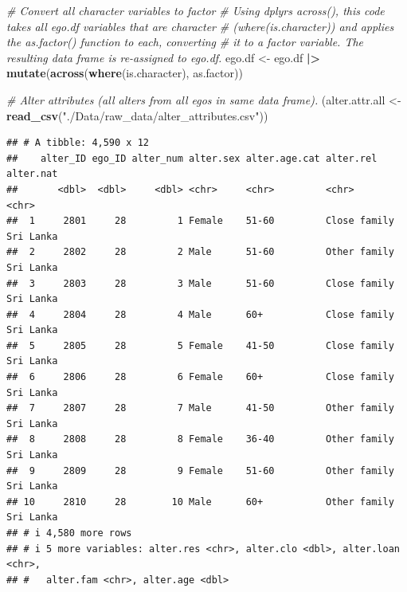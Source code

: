 \documentclass[
]{book}
\newenvironment{Shaded}{\begin{snugshade}}{\end{snugshade}}
\newcommand{\CommentTok}[1]{\textcolor[rgb]{0.56,0.35,0.01}{\textit{#1}}}
\newcommand{\FunctionTok}[1]{\textcolor[rgb]{0.13,0.29,0.53}{\textbf{#1}}}
\newcommand{\NormalTok}[1]{#1}
\newcommand{\OtherTok}[1]{\textcolor[rgb]{0.56,0.35,0.01}{#1}}
\newcommand{\SpecialCharTok}[1]{\textcolor[rgb]{0.81,0.36,0.00}{\textbf{#1}}}
\newcommand{\StringTok}[1]{\textcolor[rgb]{0.31,0.60,0.02}{#1}}
\begin{document}
\begin{Shaded}
\begin{Highlighting}[]
\CommentTok{\# Convert all character variables to factor}
\CommentTok{\# Using dplyr\textquotesingle{}s across(), this code takes all ego.df variables that are character}
\CommentTok{\# (where(is.character)) and applies the as.factor() function to each, converting }
\CommentTok{\# it to a factor variable. The resulting data frame is re{-}assigned to ego.df.}
\NormalTok{ego.df }\OtherTok{\textless{}{-}}\NormalTok{ ego.df }\SpecialCharTok{|\textgreater{}} 
  \FunctionTok{mutate}\NormalTok{(}\FunctionTok{across}\NormalTok{(}\FunctionTok{where}\NormalTok{(is.character), as.factor))}

\CommentTok{\# Alter attributes (all alters from all egos in same data frame).}
\NormalTok{(alter.attr.all }\OtherTok{\textless{}{-}} \FunctionTok{read\_csv}\NormalTok{(}\StringTok{"./Data/raw\_data/alter\_attributes.csv"}\NormalTok{))}
\end{Highlighting}
\end{Shaded}

\begin{verbatim}
## # A tibble: 4,590 x 12
##    alter_ID ego_ID alter_num alter.sex alter.age.cat alter.rel    alter.nat
##       <dbl>  <dbl>     <dbl> <chr>     <chr>         <chr>        <chr>    
##  1     2801     28         1 Female    51-60         Close family Sri Lanka
##  2     2802     28         2 Male      51-60         Other family Sri Lanka
##  3     2803     28         3 Male      51-60         Close family Sri Lanka
##  4     2804     28         4 Male      60+           Close family Sri Lanka
##  5     2805     28         5 Female    41-50         Close family Sri Lanka
##  6     2806     28         6 Female    60+           Close family Sri Lanka
##  7     2807     28         7 Male      41-50         Other family Sri Lanka
##  8     2808     28         8 Female    36-40         Other family Sri Lanka
##  9     2809     28         9 Female    51-60         Other family Sri Lanka
## 10     2810     28        10 Male      60+           Other family Sri Lanka
## # i 4,580 more rows
## # i 5 more variables: alter.res <chr>, alter.clo <dbl>, alter.loan <chr>,
## #   alter.fam <chr>, alter.age <dbl>
\end{verbatim}
\end{document}
